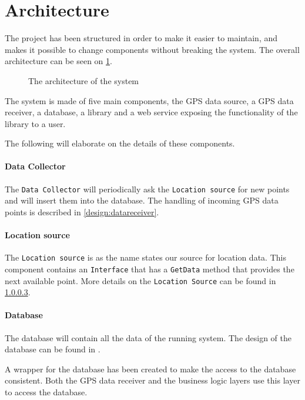 \section{Architecture}

The project has been structured in order to make it easier to maintain, and makes it possible to change components without breaking the system.
The overall architecture can be seen on \cref{arch}.

\begin{figure}[h]
\center

\caption{The architecture of the system}
\label{arch}
\end{figure}

The system is made of five main components, the GPS data source, a GPS data receiver, a database, a library and a web service exposing the functionality of the library to a user.

The following will elaborate on the details of these components.

\paragraph{Data Collector}
The \texttt{Data Collector} will periodically ask the \texttt{Location source} for new points and will insert them into the database. 
The handling of incoming GPS data points is described in \cref{design:datareceiver}.

\paragraph{Location source}
The \texttt{Location source} is as the name states our source for location data.
This component contains an \texttt{Interface} that has a \texttt{GetData} method that provides the next available point.
More details on the \texttt{Location Source} can be found in \cref{}. 


\paragraph{Database}
The database will contain all the data of the running system.
The design of the database can be found in .

A wrapper for the database has been created to make the access to the database consistent. 
Both the GPS data receiver and the business logic layers use this layer to access the database.

